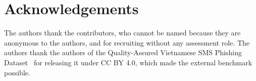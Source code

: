 \section*{Acknowledgements}
The authors thank the contributors, who cannot be named because they are anonymous to the
authors, and  for recruiting without any assessment role. The
authors thank the authors of the Quality-Assured Vietnamese SMS Phishing
Dataset~\cite{qavn_sms} for releasing it under CC BY 4.0, which made the external benchmark
possible. 
